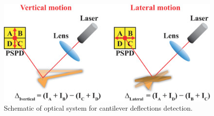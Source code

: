 \begin{figure}[htb]
\centering
\includegraphics[scale=0.4]{EXP/afm2.eps}
\caption{\label{fig:afm2}Schematic of optical system for cantilever deflections detection.}
\end{figure}

